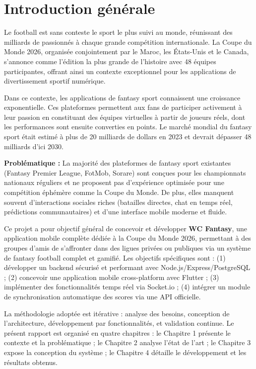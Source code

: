
\chapter*{Introduction générale}

Le football est sans conteste le sport le plus suivi au monde, réunissant des milliards de passionnés à chaque grande compétition internationale. La Coupe du Monde 2026, organisée conjointement par le Maroc, les États-Unis et le Canada, s'annonce comme l'édition la plus grande de l'histoire avec 48 équipes participantes, offrant ainsi un contexte exceptionnel pour les applications de divertissement sportif numérique.

Dans ce contexte, les applications de fantasy sport connaissent une croissance exponentielle. Ces plateformes permettent aux fans de participer activement à leur passion en constituant des équipes virtuelles à partir de joueurs réels, dont les performances sont ensuite converties en points. Le marché mondial du fantasy sport était estimé à plus de 20 milliards de dollars en 2023 et devrait dépasser 48 milliards d'ici 2030.

\textbf{Problématique :} La majorité des plateformes de fantasy sport existantes (Fantasy Premier League, FotMob, Sorare) sont conçues pour les championnats nationaux réguliers et ne proposent pas d'expérience optimisée pour une compétition éphémère comme la Coupe du Monde. De plus, elles manquent souvent d'interactions sociales riches (batailles directes, chat en temps réel, prédictions communautaires) et d'une interface mobile moderne et fluide.

Ce projet a pour objectif général de concevoir et développer \textbf{WC Fantasy}, une application mobile complète dédiée à la Coupe du Monde 2026, permettant à des groupes d'amis de s'affronter dans des ligues privées ou publiques via un système de fantasy football complet et gamifié. Les objectifs spécifiques sont : (1) développer un backend sécurisé et performant avec Node.js/Express/PostgreSQL ; (2) concevoir une application mobile cross-platform avec Flutter ; (3) implémenter des fonctionnalités temps réel via Socket.io ; (4) intégrer un module de synchronisation automatique des scores via une API officielle.

La méthodologie adoptée est itérative : analyse des besoins, conception de l'architecture, développement par fonctionnalités, et validation continue. Le présent rapport est organisé en quatre chapitres : le Chapitre 1 présente le contexte et la problématique ; le Chapitre 2 analyse l'état de l'art ; le Chapitre 3 expose la conception du système ; le Chapitre 4 détaille le développement et les résultats obtenus.
